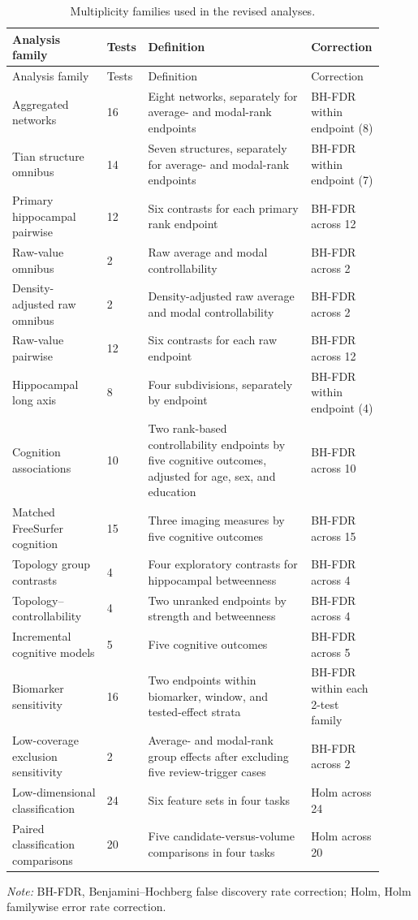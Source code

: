 \documentclass{article}
\begin{document}
\begin{landscape}
\begin{longtable}{p{0.25\linewidth}p{0.08\linewidth}p{0.43\linewidth}p{0.15\linewidth}}
\caption{Multiplicity families used in the revised analyses.}\label{tab:multiplicity_families}\\
\toprule Analysis family & Tests & Definition & Correction\\ \midrule
\endfirsthead
\toprule Analysis family & Tests & Definition & Correction\\ \midrule
\endhead
Aggregated networks & 16 & Eight networks, separately for average- and modal-rank endpoints & BH-FDR within endpoint (8)\\
Tian structure omnibus & 14 & Seven structures, separately for average- and modal-rank endpoints & BH-FDR within endpoint (7)\\
Primary hippocampal pairwise & 12 & Six contrasts for each primary rank endpoint & BH-FDR across 12\\
Raw-value omnibus & 2 & Raw average and modal controllability & BH-FDR across 2\\
Density-adjusted raw omnibus & 2 & Density-adjusted raw average and modal controllability & BH-FDR across 2\\
Raw-value pairwise & 12 & Six contrasts for each raw endpoint & BH-FDR across 12\\
Hippocampal long axis & 8 & Four subdivisions, separately by endpoint & BH-FDR within endpoint (4)\\
Cognition associations & 10 & Two rank-based controllability endpoints by five cognitive outcomes, adjusted for age, sex, and education & BH-FDR across 10\\
Matched FreeSurfer cognition & 15 & Three imaging measures by five cognitive outcomes & BH-FDR across 15\\
Topology group contrasts & 4 & Four exploratory contrasts for hippocampal betweenness & BH-FDR across 4\\
Topology--controllability & 4 & Two unranked endpoints by strength and betweenness & BH-FDR across 4\\
Incremental cognitive models & 5 & Five cognitive outcomes & BH-FDR across 5\\
Biomarker sensitivity & 16 & Two endpoints within biomarker, window, and tested-effect strata & BH-FDR within each 2-test family\\
Low-coverage exclusion sensitivity & 2 & Average- and modal-rank group effects after excluding five review-trigger cases & BH-FDR across 2\\
Low-dimensional classification & 24 & Six feature sets in four tasks & Holm across 24\\
Paired classification comparisons & 20 & Five candidate-versus-volume comparisons in four tasks & Holm across 20\\
\bottomrule
\end{longtable}
\footnotesize\noindent\textit{Note:} BH-FDR, Benjamini--Hochberg false discovery rate correction; Holm, Holm familywise error rate correction.
\end{landscape}
\end{document}
